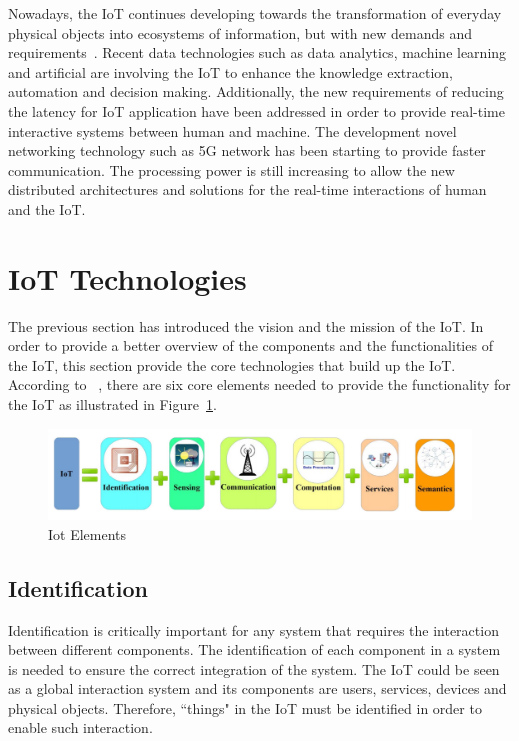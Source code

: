 Nowadays, the IoT continues developing towards the transformation of everyday physical objects into ecosystems of information, but with new demands and requirements~\citep{Vermesan:2018}.
Recent data technologies such as data analytics, machine learning and artificial are involving the IoT to enhance the knowledge extraction, automation and decision making. 
Additionally, the new requirements of reducing the latency for IoT application have been addressed in order to provide
real-time interactive systems between human and machine.
The development novel networking technology such as 5G network has been starting to provide faster communication.
The processing power is still increasing to allow the new distributed architectures and solutions for the real-time interactions of human and the IoT.  

\section{IoT Technologies}

The previous section has introduced the vision and the mission of the IoT. 
In order to provide a better overview of the components and the functionalities of the IoT, this section provide the core technologies that build up the IoT. 
According to ~\cite{Al-Fuqaha:2015}, there are six core elements needed to provide the functionality for the IoT as illustrated in Figure~\ref{fig:2.2-technologies}.

\begin{figure}
    \centering
    \includegraphics[scale=.30]{Pictures/c2/6-elements.png}
    \caption{Iot Elements~\citep{Al-Fuqaha:2015}}
    \label{fig:2.2-technologies}
\end{figure}


\subsection{Identification}

Identification is critically important for any system that requires the interaction between different components. 
The identification of each component in a system is needed to ensure the correct integration of the system.
The IoT could be seen as a global interaction system and its components are users, services, devices and physical objects.
Therefore, ``things" in the IoT must be identified in order to enable such interaction.

